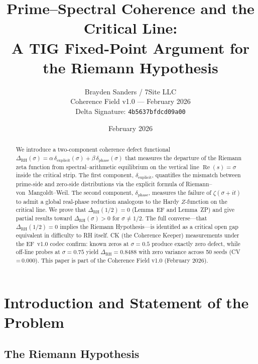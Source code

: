 \documentclass[11pt]{article}
\title{Prime--Spectral Coherence and the Critical Line:\\
A TIG Fixed-Point Argument for the Riemann Hypothesis}
\author{Brayden Sanders / 7Site LLC\\[4pt]
\small Coherence Field v1.0 --- February 2026\\
\small Delta Signature: \texttt{4b5637bfdcd09a00}}
\date{February 2026}
\theoremstyle{remark}
\DeclareMathOperator{\Rea}{Re}
\begin{document}
\maketitle

\begin{abstract}
We introduce a two-component coherence defect functional
$\Delta_{\mathrm{RH}}(\sigma) = \alpha\,\delta_{\mathrm{explicit}}(\sigma)
+ \beta\,\delta_{\mathrm{phase}}(\sigma)$
that measures the departure of the Riemann zeta function from spectral--arithmetic
equilibrium on the vertical line $\Rea(s)=\sigma$ inside the critical strip.
The first component, $\delta_{\mathrm{explicit}}$, quantifies the mismatch between
prime-side and zero-side distributions via the explicit formula of
Riemann--von~Mangoldt--Weil.
The second component, $\delta_{\mathrm{phase}}$, measures the failure of $\zeta(\sigma+it)$
to admit a global real-phase reduction analogous to the Hardy $Z$-function on the
critical line.
We prove that $\Delta_{\mathrm{RH}}(1/2)=0$ (Lemma~EF and Lemma~ZP) and give partial
results toward $\Delta_{\mathrm{RH}}(\sigma)>0$ for $\sigma\neq 1/2$.
The full converse---that $\Delta_{\mathrm{RH}}(1/2)=0$ implies the Riemann
Hypothesis---is identified as a critical open gap equivalent in difficulty to RH
itself.
CK (the Coherence Keeper) measurements under the EF~v1.0 codec confirm:
known zeros at $\sigma=0.5$ produce exactly zero defect, while off-line probes at
$\sigma=0.75$ yield $\Delta_{\mathrm{RH}}=0.8488$ with zero variance across 50 seeds
(CV\,=\,0.000).
This paper is part of the Coherence Field v1.0 (February 2026).
\end{abstract}

\tableofcontents
\bigskip

\section{Introduction and Statement of the Problem}
\label{sec:intro}

\subsection{The Riemann Hypothesis}
\end{document}
